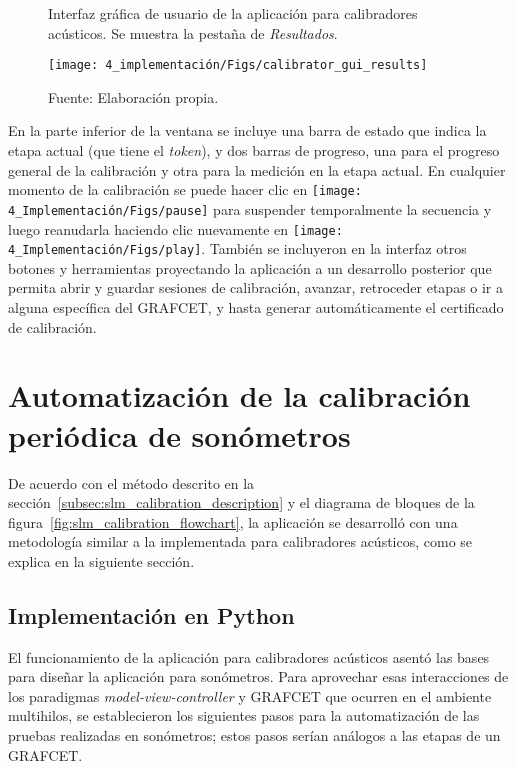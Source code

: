 \begin{figure}[!h]
    \centering
    \caption{Interfaz gráfica de usuario de la aplicación para calibradores acústicos. Se muestra la pestaña de \emph{Resultados}.}
    \label{fig:calibrator_gui_results}
    \texttt{[image: 4\_implementación/Figs/calibrator\_gui\_results]}
    \caption*{\footnotesize Fuente: Elaboración propia.}
\end{figure}

En la parte inferior de la ventana se incluye una barra de estado que indica la etapa actual (que tiene el \emph{token}), y dos barras de progreso, una para el progreso general de la calibración y otra para la medición en la etapa actual.
En cualquier momento de la calibración se puede hacer clic en \texttt{[image: 4\_Implementación/Figs/pause]} para suspender temporalmente la secuencia y luego reanudarla haciendo clic nuevamente en \texttt{[image: 4\_Implementación/Figs/play]}.
También se incluyeron en la interfaz otros botones y herramientas proyectando la aplicación a un desarrollo posterior que permita abrir y guardar sesiones de calibración, avanzar, retroceder etapas o ir a alguna específica del GRAFCET, y hasta generar automáticamente el certificado de calibración.


\section{Automatización de la calibración periódica de sonómetros}

De acuerdo con el método descrito en la sección~\ref{subsec:slm_calibration_description} y el diagrama de bloques de la figura~\ref{fig:slm_calibration_flowchart}, la aplicación se desarrolló con una metodología similar a la implementada para calibradores acústicos, como se explica en la siguiente sección.

\subsection{Implementación en Python}
El funcionamiento de la aplicación para calibradores acústicos asentó las bases para diseñar la aplicación para sonómetros.
Para aprovechar esas interacciones de los paradigmas \emph{model-view-controller} y GRAFCET que ocurren en el ambiente multihilos, se establecieron los siguientes pasos para la automatización de las pruebas realizadas en sonómetros;
estos pasos serían análogos a las etapas de un GRAFCET\@.

